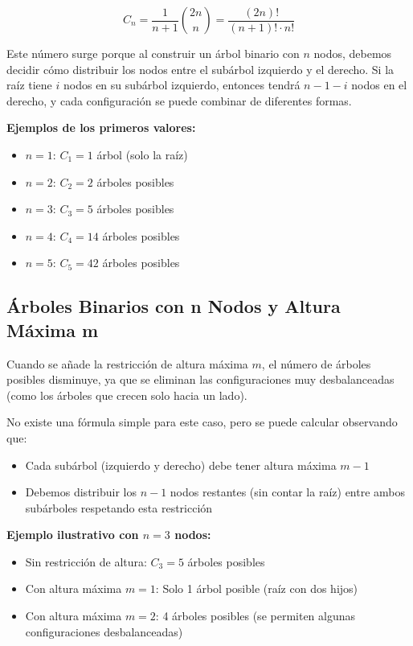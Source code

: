 \documentclass[12pt]{article}
\begin{document}
\[
C_n = \frac{1}{n+1}\binom{2n}{n} = \frac{(2n)!}{(n+1)! \cdot n!}
\]

Este número surge porque al construir un árbol binario con $n$ nodos, debemos decidir cómo distribuir los nodos entre el subárbol izquierdo y el derecho. Si la raíz tiene $i$ nodos en su subárbol izquierdo, entonces tendrá $n-1-i$ nodos en el derecho, y cada configuración se puede combinar de diferentes formas.

\textbf{Ejemplos de los primeros valores:}
\begin{itemize}[leftmargin=2em]
    \item $n=1$: $C_1 = 1$ árbol (solo la raíz)
    \item $n=2$: $C_2 = 2$ árboles posibles
    \item $n=3$: $C_3 = 5$ árboles posibles
    \item $n=4$: $C_4 = 14$ árboles posibles
    \item $n=5$: $C_5 = 42$ árboles posibles
\end{itemize}

\subsection*{Árboles Binarios con n Nodos y Altura Máxima m}

Cuando se añade la restricción de altura máxima $m$, el número de árboles posibles disminuye, ya que se eliminan las configuraciones muy desbalanceadas (como los árboles que crecen solo hacia un lado).

No existe una fórmula simple para este caso, pero se puede calcular observando que:

\begin{itemize}[leftmargin=2em]
    \item Cada subárbol (izquierdo y derecho) debe tener altura máxima $m-1$
    \item Debemos distribuir los $n-1$ nodos restantes (sin contar la raíz) entre ambos subárboles respetando esta restricción
\end{itemize}

\newpage
\textbf{Ejemplo ilustrativo con $n=3$ nodos:}
\begin{itemize}[leftmargin=2em]
    \item Sin restricción de altura: $C_3 = 5$ árboles posibles
    \item Con altura máxima $m=1$: Solo 1 árbol posible (raíz con dos hijos)
    \item Con altura máxima $m=2$: 4 árboles posibles (se permiten algunas configuraciones desbalanceadas)
\end{itemize}
\end{document}
